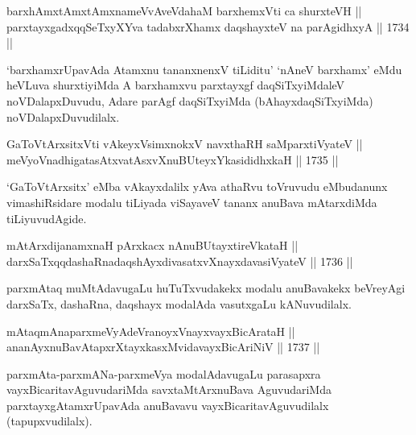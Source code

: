 
\begin{shl}
barxhAmxtAmx\s \s tAmxnameVvAveVdahaM barxhemxVti ca shurxteVH || \\
parxtayxgadxqqSeTxyXYva tadabxrXhamx daqshayxteV na parAgidhxyA \hfill || 1734 ||  
\end{shl}

\begin{artha}
`barxhamxrUpavAda Atamxnu tananxnenxV tiLiditu' `nAneV barxhamx' eMdu
heVLuva shurxtiyiMda A barxhamxvu parxtayxgf daqSiTxyiMdaleV
noVDalapxDuvudu, Adare parAgf daqSiTxyiMda (bAhayxdaqSiTxyiMda)
noVDalapxDuvudilalx.
\end{artha}


\begin{shl}
GaToV\s tArxsitxVti vAkeyxV\s simxnokxV navxthaRH saMparxtiVyateV ||  \\
meVyoV\s nadhigatasAtxvatAsxvXnuBUteyxYkasididhxkaH \hfill || 1735 ||  
\end{shl}

\begin{artha}
`GaToV\s tArxsitx' eMba vAkayxdalilx yAva athaRvu toVruvudu eMbudanunx
vimashiRsidare modalu tiLiyada viSayaveV tananx anuBava mAtarxdiMda
tiLiyuvudAgide.
\end{artha}

\begin{shl}
mAtArxdijanamxnaH pArxkacx nAnuBUtayxtireVkataH || \\
darxSaTxqqdashaRnadaqshAyxdivasatxvXnayxdavasiVyateV \hfill || 1736 || 
\end{shl}

\begin{artha}
parxmAtaq muMtAdavugaLu huTuTxvudakekx modalu anuBavakekx beVreyAgi
darxSaTx, dashaRna, daqshayx modalAda vasutxgaLu kANuvudilalx.
\end{artha}

\begin{shl}
mAtaqmAnaparxmeVyAdeVranoyxVnayxvayxBicArataH ||  \\
ananAyxnuBavAtapxrXtayxkasxMvidavayxBicAriNiV \hfill || 1737 ||  
\end{shl}

\begin{artha}
parxmAta-parxmANa-parxmeVya modalAdavugaLu parasapxra
vayxBicaritavAguvudariMda savxtaMtArxnuBava AguvudariMda
parxtayxgAtamxrUpavAda anuBavavu vayxBicaritavAguvudilalx
(tapupxvudilalx).
\end{artha}

